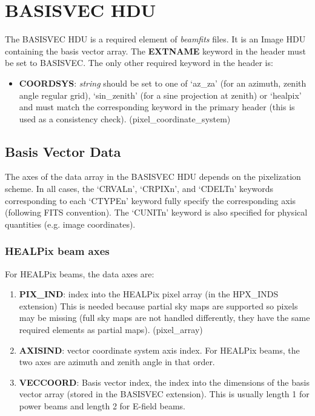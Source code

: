\documentclass[11pt, oneside]{article}   	%
\begin{document}
\section{BASISVEC HDU}
The BASISVEC HDU is a required element of \textit{beamfits} files. It is an Image HDU containing the basis vector array.
The \textbf{EXTNAME} keyword in the header must be set to BASISVEC. The only other required keyword in the header is:

\begin{itemize}
\item{\textbf{COORDSYS}: \textit{string} should be set to one of `az\_za' (for an azimuth, zenith angle regular grid), `sin\_zenith' (for a sine projection at zenith) or `healpix' and must match the corresponding keyword in the primary header (this is used as a consistency check). (pixel\_coordinate\_system)}
\end{itemize}

\subsection{Basis Vector Data}
The axes of the data array in the BASISVEC HDU depends on the pixelization scheme. In all cases, the `CRVALn', `CRPIXn', and `CDELTn' keywords corresponding to each `CTYPEn' keyword fully specify the corresponding axis (following FITS convention). The `CUNITn' keyword is also specified for physical quantities (e.g. image coordinates).

\subsubsection{HEALPix beam axes}
For HEALPix beams, the data axes are: 
\begin{enumerate}
\item{\textbf{PIX\_IND}: index into the HEALPix pixel array (in the HPX\_INDS extension) This is needed because partial sky maps are supported so pixels may be missing (full sky maps are not handled differently, they have the same required elements as partial maps). (pixel\_array)}
\item{\textbf{AXISIND}: vector coordinate system axis index. For HEALPix beams, the two axes are azimuth and zenith angle in that order.}
\item{\textbf{VECCOORD}: Basis vector index, the index into the dimensions of the basis vector array (stored in the BASISVEC extension). This is usually length 1 for power beams and length 2 for E-field beams.}
\end{enumerate}
\end{document}
